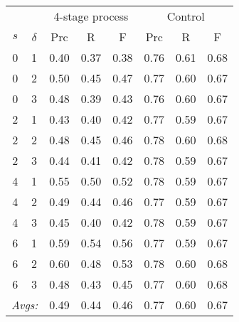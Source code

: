 {\begin{table}[htb]
{\begin{tabular}{cc|ccc|ccc}
\multicolumn{2}{c}{} & \multicolumn{3}{c}{4-stage process} & \multicolumn{3}{c}{Control} \\
$s$ & $\delta$ & Prc & R & F & Prc & R & F \\ \hline\hline
0 & 1 & 0.40 & 0.37 & 0.38 & 0.76 & 0.61 & 0.68 \\
0 & 2 & 0.50 & 0.45 & 0.47 & 0.77 & 0.60 & 0.67 \\
0 & 3 & 0.48 & 0.39 & 0.43 & 0.76 & 0.60 & 0.67 \\ \hline
2 & 1 & 0.43 & 0.40 & 0.42 & 0.77 & 0.59 & 0.67 \\
2 & 2 & 0.48 & 0.45 & 0.46 & 0.78 & 0.60 & 0.68 \\
2 & 3 & 0.44 & 0.41 & 0.42 & 0.78 & 0.59 & 0.67 \\ \hline
4 & 1 & 0.55 & 0.50 & 0.52 & 0.78 & 0.59 & 0.67 \\
4 & 2 & 0.49 & 0.44 & 0.46 & 0.77 & 0.59 & 0.67 \\
4 & 3 & 0.45 & 0.40 & 0.42 & 0.78 & 0.59 & 0.67 \\ \hline
6 & 1 & 0.59 & 0.54 & 0.56 & 0.77 & 0.59 & 0.67 \\
6 & 2 & 0.60 & 0.48 & 0.53 & 0.78 & 0.60 & 0.68 \\
6 & 3 & 0.48 & 0.43 & 0.45 & 0.77 & 0.60 & 0.68 \\ \hline\hline
 \multicolumn{2}{r|}{\textit{Avgs:}} & 0.49 & 0.44 & 0.46 & 0.77 & 0.60 & 0.67 \\
\end{tabular}
}  
\end{table}}
